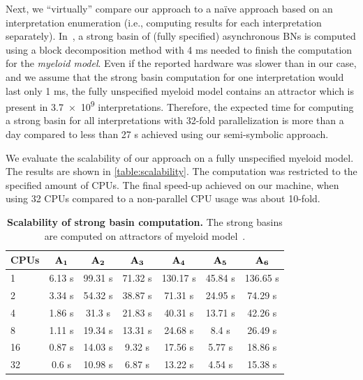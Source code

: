 Next, we ``virtually'' compare our approach to a na\"ive approach based on an interpretation enumeration (i.e., computing results for each interpretation separately). In~\cite{Baudin2019}, a strong basin of (fully specified) asynchronous BNs is computed using a block decomposition method with 4 ms needed to finish the computation for the \emph{myeloid model}. Even if the reported hardware was slower than in our case, and we assume that the strong basin computation for one interpretation would last only 1 ms, the fully unspecified myeloid model contains an attractor which is present in \num{3.7e9} interpretations. Therefore, the expected time for computing a strong basin for all interpretations with 32-fold parallelization is more than a day compared to less than 27 s achieved using our semi-symbolic approach.

We evaluate the scalability of our approach on a fully unspecified myeloid model. The results are shown in \autoref{table:scalability}. The computation was restricted to the specified amount of CPUs. The final speed-up achieved on our machine, when using 32 CPUs compared to a non-parallel CPU usage was about 10-fold.

\begin{table}
	\caption{\textbf{Scalability of strong basin computation.} The strong basins are computed on attractors of myeloid model~\cite{Krumsiek2011}.}
	\setlength\tabcolsep{0pt}
	\begin{tabular*}{\linewidth}{@{\extracolsep{\fill}}lcccccc}
		\hline
		\textbf{CPUs} &  $\mathbf{A_1}$  & $\mathbf{A_2}$ & $\mathbf{A_3}$ & $\mathbf{A_4}$ & $\mathbf{A_5}$ & $\mathbf{A_6}$ \\
		\hline
		1 & 6.13 s & 99.31 s & 71.32 s & 130.17 s & 45.84 s & 136.65 s \\
		
		2 & 3.34 s & 54.32 s & 38.87 s & 71.31 s & 24.95 s & 74.29 s \\
		
		4 & 1.86 s & 31.3 s & 21.83 s & 40.31 s & 13.71 s & 42.26 s \\
		
		8 & 1.11 s & 19.34 s & 13.31 s & 24.68 s & 8.4 s & 26.49 s \\
		
		16 & 0.87 s & 14.03 s & 9.32 s & 17.56 s & 5.77 s & 18.86 s \\
		
		32 & 0.6 s & 10.98 s & 6.87 s & 13.22 s & 4.54 s & 15.38 s \\
		\bottomrule
	\end{tabular*}
	\label{table:scalability}
\end{table}

